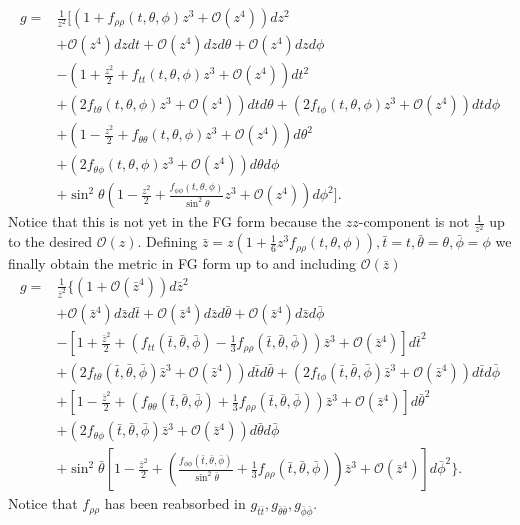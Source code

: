 \documentclass[12pt]{iopart} %
\begin{document}
\begin{eqnarray}
g=&\frac{1}{z^2}\biggl[ 
\left(1+f_{\rho\rho}(t,\theta,\phi)z^3+\mathcal{O}(z^4)\right)dz^2 \nonumber \\
&+\mathcal{O}(z^4) dz dt+\mathcal{O}(z^4) dz d\theta+\mathcal{O}(z^4) dz d\phi \nonumber \\
&- \left(1+\frac{z^2}{2}+f_{tt}(t,\theta,\phi)z^3 +\mathcal{O}(z^4)\right)dt^2 \nonumber \\
&+ \left(2 f_{t\theta}(t,\theta,\phi)z^3+\mathcal{O}(z^4)\right)dt d\theta + \left(2 f_{t\phi}(t,\theta,\phi) z^3+\mathcal{O}(z^4)\right)dt d\phi  \nonumber \\
&+  \left(1-\frac{z^2}{2}+f_{\theta\theta}(t,\theta,\phi)z^3 +\mathcal{O}(z^4)\right)d\theta^2 \nonumber \\
&+ \left(2 f_{\theta\phi}(t,\theta,\phi) z^3+\mathcal{O}(z^4)\right)d\theta d\phi \nonumber\\
&+  \sin^2\theta \left(1-\frac{z^2}{2}+\frac{f_{\phi\phi}(t,\theta,\phi)}{\sin^2\theta} z^3 +\mathcal{O}(z^4)\right)d\phi^2
\biggr].
\end{eqnarray}
Notice that this is not yet in the FG form because the $zz$-component is not $\frac{1}{z^2}$ up to the desired $\mathcal{O}(z)$. Defining $\bar{z}=z\left(1+\frac{1}{6}z^3f_{\rho\rho}(t,\theta,\phi)\right),\bar{t}=t,\bar{\theta}=\theta,\bar{\phi}=\phi$ we finally obtain the metric in FG form up to and including $\mathcal{O}(\bar{z})$
\begin{eqnarray}
g=&\frac{1}{\bar{z}^2}\biggl\{ 
\left(1+\mathcal{O}(\bar{z}^4)\right)d\bar{z}^2 \nonumber \\
&+\mathcal{O}(\bar{z}^4) d\bar{z} d\bar{t}+\mathcal{O}(\bar{z}^4) d\bar{z} d\bar{\theta}+\mathcal{O}(\bar{z}^4) d\bar{z} d\bar{\phi} \nonumber \\
&- \left[1+\frac{\bar{z}^2}{2}+\left(f_{tt}(\bar{t},\bar{\theta},\bar{\phi})-\frac{1}{3}f_{\rho\rho}(\bar{t},\bar{\theta},\bar{\phi})\right)\bar{z}^3 +\mathcal{O}(\bar{z}^4)\right]d\bar{t}^2 \nonumber \\
&+ \left(2 f_{t\theta}(\bar{t},\bar{\theta},\bar{\phi})\bar{z}^3+\mathcal{O}(\bar{z}^4)\right)d\bar{t} d\bar{\theta} + \left(2 f_{t\phi}(\bar{t},\bar{\theta},\bar{\phi}) \bar{z}^3+\mathcal{O}(\bar{z}^4)\right)d\bar{t} d\bar{\phi}  \nonumber \\
&+  \left[1-\frac{\bar{z}^2}{2}+\left(f_{\theta\theta}(\bar{t},\bar{\theta},\bar{\phi})+\frac{1}{3}f_{\rho\rho}(\bar{t},\bar{\theta},\bar{\phi})\right)\bar{z}^3 +\mathcal{O}(\bar{z}^4)\right]d\bar{\theta}^2 \nonumber \\
&+ \left(2 f_{\theta\phi}(\bar{t},\bar{\theta},\bar{\phi}) \bar{z}^3+\mathcal{O}(\bar{z}^4)\right)d\bar{\theta} d\bar{\phi} \nonumber\\
&+   \sin^2\bar{\theta} \left[1-\frac{\bar{z}^2}{2}+\left(\frac{f_{\phi\phi}(\bar{t},\bar{\theta},\bar{\phi})}{ \sin^2\bar{\theta}}+\frac{1}{3}f_{\rho\rho}(\bar{t},\bar{\theta},\bar{\phi})\right)\bar{z}^3 +\mathcal{O}(\bar{z}^4)\right]d\bar{\phi}^2
\biggr\}.
\end{eqnarray}
Notice that $f_{\rho\rho}$ has been reabsorbed in $g_{\bar{t}\bar{t}},g_{\bar{\theta}\bar{\theta}},g_{\bar{\phi}\bar{\phi}}$.
\end{document}
